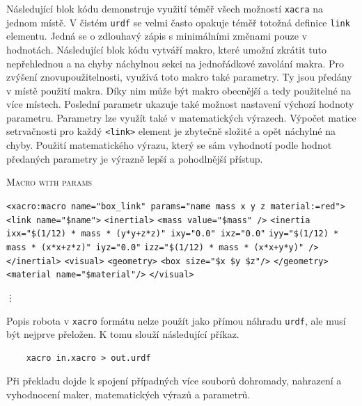 Následující blok kódu demonstruje využití téměř všech možností \verb|xacra| na jednom místě.
V čistém \verb|urdf| se velmi často opakuje téměř totožná definice \verb|link| elementu. Jedná se o zdlouhavý zápis s minimálními změnami pouze v hodnotách. Následující blok kódu vytváří makro, které umožní zkrátit tuto nepřehlednou a na chyby náchylnou sekci na jednořádkové zavolání makra. Pro zvýšení znovupoužitelnosti, využívá toto makro také parametry. Ty jsou předány v místě použití makra. Díky nim může být makro obecnější a tedy použitelné na více místech. Poslední parametr ukazuje také možnost nastavení výchozí hodnoty parametru. Parametry lze využít také v matematických výrazech. Výpočet matice setrvačnosti pro každý \verb|<link>| element je zbytečně složité a opět náchylné na chyby. Použití matematického výrazu, který se sám vyhodnotí podle hodnot předaných parametry je výrazně lepší a pohodlnější přístup.

\begin{algorithm}[h!]
	\label{}
	\caption{\textsc{Macro with params}}
	
	\DontPrintSemicolon
	\SetAlgoNoLine
	\SetNlSty{}{}{:}
	\SetNlSkip{-1.1em}
	
	\BlankLine \Indp\Indpp
	
	\texttt{<xacro:macro name="box\_link" params="name mass x y z material:=red">}\;
	\Indp\Indp
	\texttt{<link name="\${name}">}\;
	\Indp\Indp
	\texttt{<inertial>}\;
	\Indp\Indp
	\texttt{<mass value="\${mass}" />}\;
	\texttt{<inertia ixx="\${(1/12) * mass * (y*y+z*z)}" ixy="0.0" ixz="0.0"}\;
	\Indp\Indp
	\texttt{iyy="\${(1/12) * mass * (x*x+z*z)}" iyz="0.0"}\;
	\texttt{izz="\${(1/12) * mass * (x*x+y*y)}" />}\;
	\Indm\Indm
	\Indm\Indm
	\texttt{</inertial>}\;
	\texttt{<visual>}\;
	\Indp\Indp
	\texttt{<geometry>}\;	
	\Indp\Indp
	\texttt{<box size="\${x} \${y} \${z}"/>}\;
	\Indm\Indm
	\texttt{</geometry>}\;
	\texttt{<material name="\${material}"/>}\;
	\Indm\Indm
	\texttt{</visual>}\;
    \begin{center}
	\texttt{\vdots}
	\end{center}
	
\end{algorithm}

Popis robota v \verb|xacro| formátu nelze použít jako přímou náhradu \verb|urdf|, ale musí být nejprve přeložen. K tomu slouží následující příkaz.
\begin{verbatim}
	xacro in.xacro > out.urdf
\end{verbatim}
Při překladu dojde k spojení případných více souborů dohromady, nahrazení a vyhodnocení maker, matematických výrazů a parametrů.

